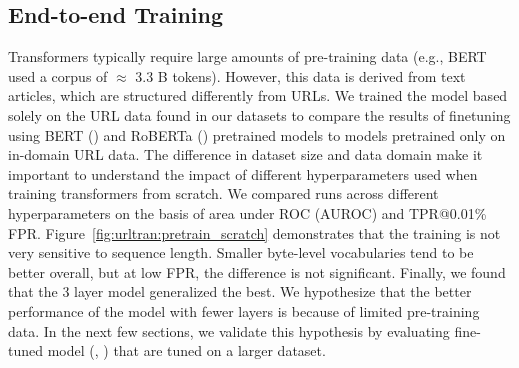 \subsection{End-to-end Training}
Transformers typically require large amounts of pre-training data (e.g., BERT~\citep{devlin2019bert} used a corpus of  $\approx$ 3.3 B tokens).
However, this data is derived from text articles, which are structured differently from URLs.
We trained the \URLTranSysc model based solely on the URL data found in our datasets to compare the results of finetuning using BERT (\URLTranSysb) and RoBERTa (\URLTranSysc) pretrained models to models pretrained only on in-domain URL data. 
The difference in dataset size and data domain make it important to understand the impact of different hyperparameters used when training transformers from scratch.
We compared runs across different hyperparameters on the basis of area under ROC (AUROC) and TPR@0.01\% FPR.
Figure~\ref{fig:urltran:pretrain_scratch} demonstrates that the training is not very sensitive to sequence length. 
Smaller byte-level vocabularies tend to be better overall, but at low FPR, the difference is not significant.
Finally, we found that the 3 layer model generalized the best.
We hypothesize that the better performance of the model with fewer layers is because of limited pre-training data.%
In the next few sections, we validate this hypothesis by evaluating fine-tuned model (\URLTranSysb, \URLTranSysr) that are tuned on a larger dataset.

